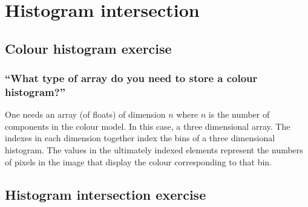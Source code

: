 \documentclass[abstract=true]{scrartcl}
\title{}
\author{Joris Stork, Lucas Swartsenburg}
\begin{document}
\maketitle


\section{Histogram intersection}

    \subsection{Colour histogram exercise}

        \subsubsection{``What type of array do you need to store a colour
            histogram?''}

            One needs an array (of floats) of dimension $n$ where $n$ is the
            number of components in the colour model. In this case, a three
            dimensional array. The indexes in each dimension together index the
            bins of a three dimensional histogram. The values in the ultimately
            indexed elements represent the numbers of pixels in the image that
            display the colour corresponding to that bin. 

    \subsection{Histogram intersection exercise}
\end{document}

